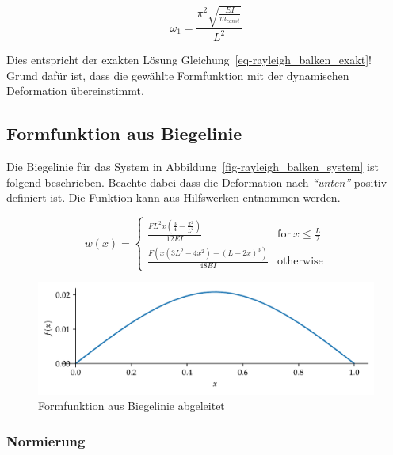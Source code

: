 \documentclass[
  letterpaper,
  DIV=11]{scrreprt}
\begin{document}
\begin{equation}\omega_{1} = \frac{\pi^{2} \sqrt{\frac{E I}{m_{const}}}}{L^{2}}\end{equation}

Dies entspricht der exakten Lösung
Gleichung~\ref{eq-rayleigh_balken_exakt}! Grund dafür ist, dass die
gewählte Formfunktion mit der dynamischen Deformation übereinstimmt.

\hypertarget{formfunktion-aus-biegelinie}{%
\subsection{Formfunktion aus
Biegelinie}\label{formfunktion-aus-biegelinie}}

Die Biegelinie für das System in
Abbildung~\ref{fig-rayleigh_balken_system} ist folgend beschrieben.
Beachte dabei dass die Deformation nach \emph{``unten''} positiv
definiert ist. Die Funktion kann aus Hilfswerken entnommen werden.

\begin{equation}w{\left(x \right)} = \begin{cases} \frac{F L^{2} x \left(\frac{3}{4} - \frac{x^{2}}{L^{2}}\right)}{12 E I} & \text{for}\: x \leq \frac{L}{2} \\\frac{F \left(x \left(3 L^{2} - 4 x^{2}\right) - \left(L - 2 x\right)^{3}\right)}{48 E I} & \text{otherwise} \end{cases}\end{equation}

\begin{figure}[H]

{\centering \includegraphics{index_files/mediabag/rayleigh_03_files/figure-pdf/fig-formfunktion_biege-output-1.pdf}

}

\caption{\label{fig-formfunktion_biege}Formfunktion aus Biegelinie
abgeleitet}

\end{figure}

\hypertarget{normierung}{%
\subsubsection{Normierung}\label{normierung}}
\end{document}

